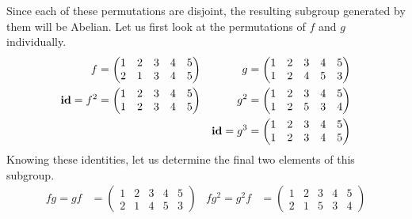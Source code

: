 \documentclass{article}
\begin{document}
Since each of these permutations are disjoint, the resulting subgroup generated by them will be Abelian. Let us first look at the permutations of $f$ and $g$ individually.
\begin{align*}
    f & = \begin{pmatrix} 
        1 & 2 & 3 & 4 & 5 \\
        2 & 1 & 3 & 4 & 5 
    \end{pmatrix} &
    g & = \begin{pmatrix} 
        1 & 2 & 3 & 4 & 5 \\
        1 & 2 & 4 & 5 & 3
    \end{pmatrix} \\
    \operatorname{\textbf{id}} = f^2 & = \begin{pmatrix}
        1 & 2 & 3 & 4 & 5 \\
        1 & 2 & 3 & 4 & 5
    \end{pmatrix} &
    g^2 & = \begin{pmatrix}
        1 & 2 & 3 & 4 & 5 \\
        1 & 2 & 5 & 3 & 4
    \end{pmatrix} \\
    && \operatorname{\textbf{id}} = g^3 & = \begin{pmatrix}
        1 & 2 & 3 & 4 & 5 \\
        1 & 2 & 3 & 4 & 5
    \end{pmatrix}
\end{align*}
Knowing these identities, let us determine the final two elements of this subgroup.
\begin{align*}
    fg = gf & = \begin{pmatrix}
        1 & 2 & 3 & 4 & 5 \\
        2 & 1 & 4 & 5 & 3
    \end{pmatrix} &
    fg^2 = g^2f & = \begin{pmatrix}
        1 & 2 & 3 & 4 & 5 \\
        2 & 1 & 5 & 3 & 4
    \end{pmatrix}
\end{align*}
\end{document}
